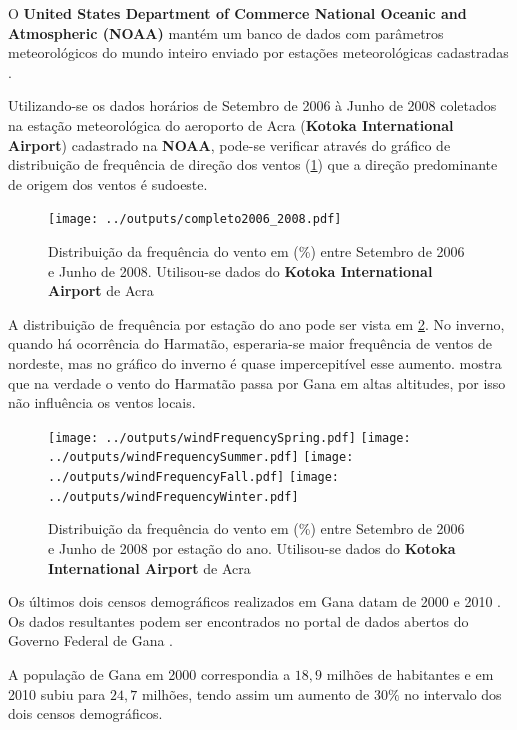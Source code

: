 O \textbf{United States Department of Commerce National Oceanic 
and Atmospheric (NOAA)} mantém um banco de dados com parâmetros 
meteorológicos do mundo inteiro enviado por estações meteorológicas 
cadastradas \citep{noaa}. 

Utilizando-se os dados horários de Setembro de 2006 à Junho de 2008 
coletados na estação meteorológica do aeroporto de Acra 
(\textbf{Kotoka International Airport}) cadastrado na \textbf{NOAA},
pode-se verificar através do gráfico de distribuição de frequência de
direção dos ventos (\ref{fg:windFrequencyCompleto}) que a direção 
predominante de origem dos ventos é sudoeste.
 
\begin{figure}[H]
  \centering
  \texttt{[image: ../outputs/completo2006\_2008.pdf]}
  \caption{Distribuição da frequência do vento em (\%) entre
           Setembro de 2006 e Junho de 2008. Utilisou-se dados 
           do \textbf{Kotoka International Airport} de Acra \label{fg:windFrequencyCompleto}}
\end{figure}

A distribuição de frequência por estação do ano pode ser vista em 
\ref{fg:windFrequencyStation}. 
No inverno, quando há ocorrência do Harmatão, esperaria-se maior
frequência de ventos de nordeste, mas no gráfico do inverno é quase 
impercepitível esse aumento. \citep{breuning2005} mostra que na 
verdade o vento do Harmatão passa por Gana em altas altitudes, por isso
não influência os ventos locais. 

\begin{figure}[H]
  \centering
  \texttt{[image: ../outputs/windFrequencySpring.pdf]}
  \texttt{[image: ../outputs/windFrequencySummer.pdf]}
  \texttt{[image: ../outputs/windFrequencyFall.pdf]}
  \texttt{[image: ../outputs/windFrequencyWinter.pdf]}
  \caption{Distribuição da frequência do vento em (\%) entre
           Setembro de 2006 e Junho de 2008 por estação do ano. Utilisou-se dados 
           do \textbf{Kotoka International Airport} de Acra \label{fg:windFrequencyStation}}
\end{figure}

Os últimos dois censos demográficos realizados em Gana datam
de 2000 \citep{ghanacensus2003} e 2010 \citep{ghanacensus2013}. Os
dados resultantes podem ser encontrados no portal de dados abertos
do Governo Federal de Gana \citep{opendataghana}.

A população de Gana em 2000 correspondia a $18,9$ milhões 
de habitantes e em 2010 subiu para $24,7$ milhões, tendo assim
um aumento de $30\%$ no intervalo dos dois censos demográficos.

